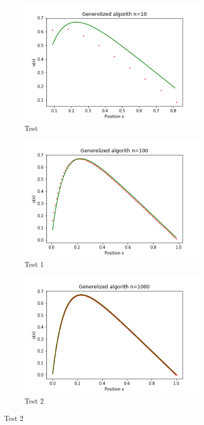 \documentclass[10pt]{article}
\begin{document}
 \begin{figure}[h]
  \begin{subfigure}{.5\textwidth}
    \centering 
    \includegraphics[scale=0.4]{alg-0-n10plot.png}
    \caption{Test}
    \label{fig:sub1}
  \end{subfigure}
  \begin{subfigure}{.5\textwidth}
    \centering
    \includegraphics[scale=0.4]{alg-0-n100plot.png}
    \caption{Test 1}
  \end{subfigure}
  \begin{subfigure}{.5\textwidth}
    \centering
    \includegraphics[scale=0.4]{alg-0-n1000plot.png}
    \caption{Test 2}
  \end{subfigure}
    

\end{figure}
\end{document}
